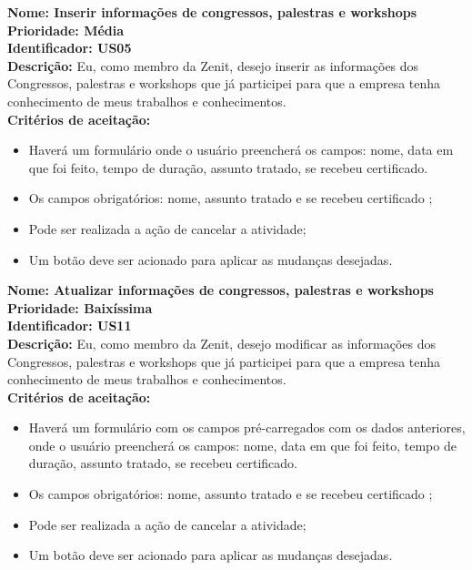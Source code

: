 \begin{anexosenv}
\indent \textbf{Nome: Inserir informações de congressos, palestras e workshops\\
    \indent Prioridade: Média\\
    \indent Identificador: US05\\
    \indent Descrição:} Eu, como membro da Zenit, desejo inserir as informações dos Congressos, palestras e workshops que já participei para que a empresa tenha conhecimento de meus trabalhos e conhecimentos.\\
\indent \textbf{Critérios de aceitação:}
\begin{itemize}
    \item Haverá um formulário onde o usuário preencherá os campos: nome, data em que foi feito, tempo de duração, assunto tratado, se recebeu certificado.
    \item Os campos obrigatórios: nome, assunto tratado e se recebeu certificado ;
    \item Pode ser realizada a ação de cancelar a atividade;
    \item Um botão deve ser acionado para aplicar as mudanças desejadas.
\end{itemize}

\indent \textbf{Nome: Atualizar informações de congressos, palestras e workshops\\
    \indent Prioridade: Baixíssima\\
    \indent Identificador: US11\\
    \indent Descrição:} Eu, como membro da Zenit, desejo modificar as informações dos Congressos, palestras e workshops que já participei para que a empresa tenha conhecimento de meus trabalhos e conhecimentos.\\
\indent \textbf{Critérios de aceitação:}
\begin{itemize}
    \item Haverá um formulário com os campos pré-carregados com os dados anteriores, onde o usuário preencherá os campos: nome, data em que foi feito, tempo de duração, assunto tratado, se recebeu certificado.
    \item Os campos obrigatórios: nome, assunto tratado e se recebeu certificado ;
    \item Pode ser realizada a ação de cancelar a atividade;
    \item Um botão deve ser acionado para aplicar as mudanças desejadas.
    
\end{itemize}


\end{anexosenv}
